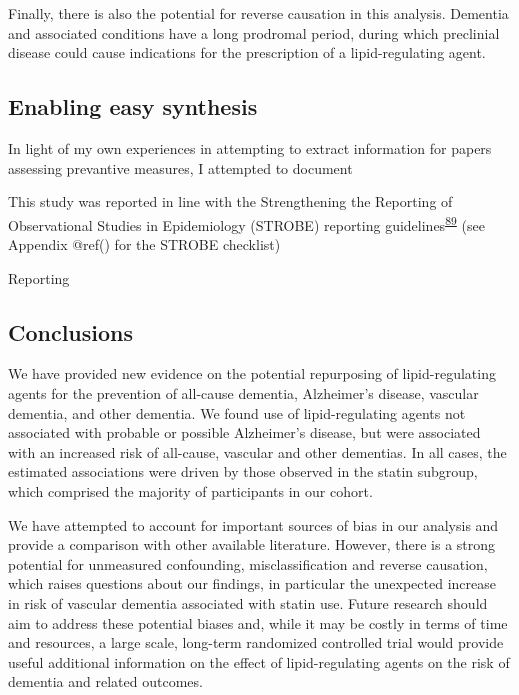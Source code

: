\documentclass[a4paper, twoside]{templates/ociamthesis}
\begin{document}
Finally, there is also the potential for reverse causation in this analysis. Dementia and associated conditions have a long prodromal period, during which preclinial disease could cause indications for the prescription of a lipid-regulating agent.

\hypertarget{enabling-easy-synthesis}{%
\subsection{Enabling easy synthesis}\label{enabling-easy-synthesis}}

In light of my own experiences in attempting to extract information for papers assessing prevantive measures, I attempted to document

This study was reported in line with the Strengthening the Reporting of Observational Studies in Epidemiology (STROBE) reporting guidelines\textsuperscript{\protect\hyperlink{ref-vandenbroucke2007}{89}} (see Appendix @ref() for the STROBE checklist)

Reporting

\hypertarget{conclusions}{%
\subsection{Conclusions}\label{conclusions}}

We have provided new evidence on the potential repurposing of lipid-regulating agents for the prevention of all-cause dementia, Alzheimer's disease, vascular dementia, and other dementia. We found use of lipid-regulating agents not associated with probable or possible Alzheimer's disease, but were associated with an increased risk of all-cause, vascular and other dementias. In all cases, the estimated associations were driven by those observed in the statin subgroup, which comprised the majority of participants in our cohort.

We have attempted to account for important sources of bias in our analysis and provide a comparison with other available literature. However, there is a strong potential for unmeasured confounding, misclassification and reverse causation, which raises questions about our findings, in particular the unexpected increase in risk of vascular dementia associated with statin use. Future research should aim to address these potential biases and, while it may be costly in terms of time and resources, a large scale, long-term randomized controlled trial would provide useful additional information on the effect of lipid-regulating agents on the risk of dementia and related outcomes.
\end{document}
